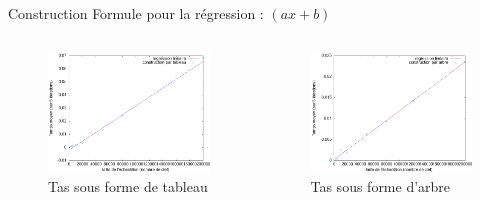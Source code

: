 \documentclass[11pt]{beamer}
\begin{document}
\begin{frame}{Construction}
Formule pour la régression : $(ax +b)$

\begin{columns}[t]
  \begin{column}{5cm}
  
\begin{figure}[hbtp]
\centering
\includegraphics[width=5cm]{../Images/svg courbes pour rapport/cplxt_cons_tab_regression.png}
\caption{Tas sous forme de tableau}
\label{fig1}
\end{figure}


  \end{column}
  
  \begin{column}{5cm}
  
\begin{figure}[hbtp]
\centering
\includegraphics[width=5cm]{../Images/svg courbes pour rapport/cplxt_cons_arbre_regression.png}
\caption{Tas sous forme d'arbre}
\label{fig2}
\end{figure}
  
  
  \end{column}
 \end{columns}  



\end{frame}
\end{document}
